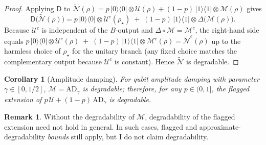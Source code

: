 \documentclass[11pt]{article}
\theoremstyle{plain}
\newtheorem{corollary}[theorem]{Corollary}
\theoremstyle{definition}
\newtheorem{remark}[theorem]{Remark}
\numberwithin{equation}{section}
\begin{document}
\begin{proof}
Applying $\mathsf D$ to $\widetilde{\mathcal N}(\rho)=p\,|0\rangle\!\langle 0|\!\otimes\!\mathcal U(\rho)+(1-p)\,|1\rangle\!\langle 1|\!\otimes\!\mathcal M(\rho)$ gives
\[
\mathsf D\!\big(\widetilde{\mathcal N}(\rho)\big)=
p\,|0\rangle\!\langle 0|\!\otimes\!\mathcal U^c(\rho_\star)\;+\;(1-p)\,|1\rangle\!\langle 1|\!\otimes\!\Delta\big(\mathcal M(\rho)\big).
\]
Because $\mathcal U^c$ is independent of the $B$-output and $\Delta\circ\mathcal M=\mathcal M^c$, the right-hand side equals
$p\,|0\rangle\!\langle 0|\!\otimes\!\mathcal U^c(\rho)\;+\;(1-p)\,|1\rangle\!\langle 1|\!\otimes\!\mathcal M^c(\rho)=\widetilde{\mathcal N}^c(\rho)$ up to the harmless choice of $\rho_\star$ for the unitary branch (any fixed choice matches the complementary output because $\mathcal U^c$ is constant). Hence $\widetilde{\mathcal N}$ is degradable.
\end{proof}

\begin{corollary}[Amplitude damping]
For qubit amplitude damping with parameter $\gamma\in[0,1/2]$, $\mathcal M=\mathrm{AD}_\gamma$ is degradable; therefore, for any $p\in(0,1]$, the flagged extension of $p\,\mathcal U+(1-p)\,\mathrm{AD}_\gamma$ is degradable.
\end{corollary}

\begin{remark}
Without the degradability of $\mathcal M$, degradability of the flagged extension need not hold in general. In such cases, flagged and approximate-degradability \emph{bounds} still apply, but I do not claim degradability.
\end{remark}
\end{document}

